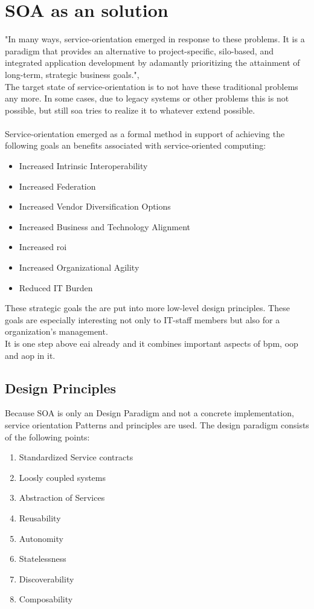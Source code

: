 \documentclass[12pt]{article}
\begin{document}
\section{SOA as an solution} 
"In many ways, service-orientation emerged in response to these problems. It is a paradigm that provides an alternative to project-specific, silo-based, and integrated application development by adamantly prioritizing the attainment of long-term, strategic business goals.",\cite[page 522]{grau} \\
The target state of service-orientation is to not have these traditional problems any more. In some cases, due to legacy systems or other problems this is not possible, but still \gls{soa} tries to realize it to whatever extend possible.
\\ \\
Service-orientation emerged as a formal method in support of achieving the following goals an benefits associated with service-oriented computing: \\
\begin{itemize}
\item Increased Intrinsic Interoperability
\item Increased Federation
\item Increased Vendor Diversification Options 
\item Increased Business and Technology Alignment
\item Increased \gls{roi}
\item Increased Organizational Agility
\item Reduced IT Burden
\end{itemize} \cite[page 23]{grau}
These strategic goals the are put into more low-level design principles. These goals are especially interesting not only to IT-staff members but also for a organization's management. \\
It is one step above \gls{eai} already and it combines important aspects of \gls{bpm}, \gls{oop} and \gls{aop} in it.
\subsection{Design Principles}
\label{sec:dp}
Because SOA is only an Design Paradigm and not a concrete implementation, service orientation Patterns and principles are used. The design paradigm consists of the following points:
\begin{enumerate}
\item Standardized Service contracts
\item Loosly coupled systems
\item Abstraction of Services
\item Reusability
\item Autonomity
\item Statelessness
\item Discoverability
\item Composability
\end{enumerate}\cite[page 25]{grau}
\end{document}
